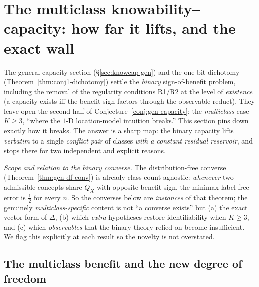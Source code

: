 \section{The multiclass knowability--capacity: how far it lifts, and the exact wall}
\label{sec:mc-capacity}

\providecommand{\TV}{\mathrm{TV}}
\providecommand{\sgn}{\operatorname{sign}}
\providecommand{\R}{\mathbb R}
\providecommand{\citep}[1]{\cite{#1}}
\providecommand{\citet}[1]{\cite{#1}}

The general-capacity section (\S\ref{sec:knowcap-gen}) and the one-bit dichotomy
(Theorem~\ref{thm:conj1-dichotomy}) settle the \emph{binary} sign-of-benefit problem, including the
removal of the regularity conditions R1/R2 at the level of \emph{existence}
(a capacity exists iff the benefit sign factors through the
observable reduct). They leave open the second half of
Conjecture~\ref{conj:gen-capacity}: the \emph{multiclass} case $K\ge3$, ``where the
$1$-D location-model intuition breaks.'' This section pins down exactly how it breaks. The
answer is a sharp map: the binary capacity lifts \emph{verbatim} to a single
\emph{conflict pair} of classes \emph{with a constant residual reservoir}, and stops there
for two independent and explicit reasons.

\medskip
\noindent\emph{Scope and relation to the binary converse.} The distribution-free converse
(Theorem~\ref{thm:gen-df-conv}) is already class-count
agnostic: \emph{whenever} two admissible concepts share $Q_X$ with opposite benefit sign,
the minimax label-free error is $\tfrac12$ for every $n$. So the converses below are
\emph{instances} of that theorem; the genuinely \emph{multiclass-specific} content is not
``a converse exists'' but (a) the exact vector form of $\Delta$, (b) which \emph{extra}
hypotheses restore identifiability when $K\ge3$, and (c) which \emph{observables} that the
binary theory relied on become insufficient. We flag this explicitly at each result so the
novelty is not overstated.

\subsection{The multiclass benefit and the new degree of freedom}\label{sec:mc-setup}
